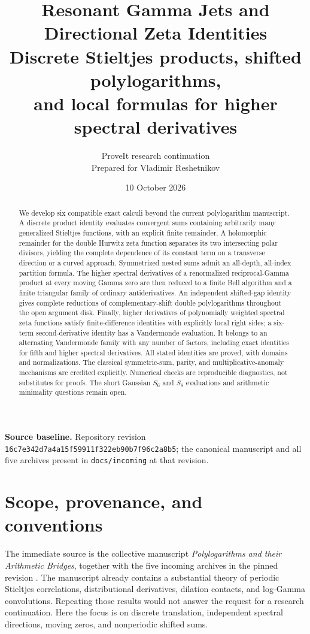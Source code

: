 \documentclass[11pt,letterpaper]{article}
\title{Resonant Gamma Jets and Directional Zeta Identities\\[7pt]
\large Discrete Stieltjes products, shifted polylogarithms,\\
and local formulas for higher spectral derivatives}
\author{ProveIt research continuation\\\small Prepared for Vladimir Reshetnikov}
\date{10 October 2026}
\numberwithin{equation}{section}
\theoremstyle{plain}
\theoremstyle{definition}
\theoremstyle{remark}
\newcommand{\src}[1]{\nolinkurl{#1}}
\begin{document}
\maketitle
\begin{abstract}
We develop six compatible exact calculi beyond the current polylogarithm
manuscript. A discrete product identity evaluates convergent sums containing
arbitrarily many generalized Stieltjes functions, with an explicit finite
remainder. A holomorphic remainder for the double Hurwitz zeta function
separates its two intersecting polar divisors, yielding the complete
dependence of its constant term on a transverse direction or a curved
approach. Symmetrized nested sums admit an all-depth, all-index partition
formula. The higher spectral derivatives of a renormalized reciprocal-Gamma
product at every moving Gamma zero are then reduced to a finite Bell
algorithm and a finite triangular family of ordinary antiderivatives.
An independent shifted-gap identity gives complete reductions of
complementary-shift double polylogarithms throughout the open argument
disk. Finally, higher derivatives of polynomially weighted spectral zeta
functions satisfy finite-difference identities with explicitly local right
sides; a six-term second-derivative identity has a Vandermonde evaluation.
It belongs to an alternating Vandermonde family with any number of factors,
including exact identities for fifth and higher spectral derivatives.
All stated identities are proved, with domains and normalizations. The
classical symmetric-sum, parity, and multiplicative-anomaly mechanisms are
credited explicitly. Numerical checks are reproducible diagnostics, not
substitutes for proofs. The short Gaussian $S_6$ and $S_8$ evaluations and
arithmetic minimality questions remain open.
\end{abstract}
\vspace{5pt}
\noindent\textbf{Source baseline.} Repository revision
\src{16c7e342d7a4a15f59911f322eb90b7f96c2a8b5}; the canonical manuscript and
all five archives present in \src{docs/incoming} at that revision.
\clearpage
\tableofcontents
\clearpage
\section{Scope, provenance, and conventions}\label{sec:scope}

The immediate source is the collective manuscript \emph{Polylogarithms and
their Arithmetic Bridges}, together with the five incoming archives in the
pinned revision \cite{repo,nested,gauss,mellin,stharm,translation}. The
manuscript already contains a substantial theory of periodic Stieltjes
correlations, distributional derivatives, dilation contacts, and
log-Gamma convolutions. Repeating those results would not answer the
request for a research continuation. Here the focus is on discrete
translation, independent spectral directions, moving zeros, and
nonperiodic shifted sums.
\end{document}
